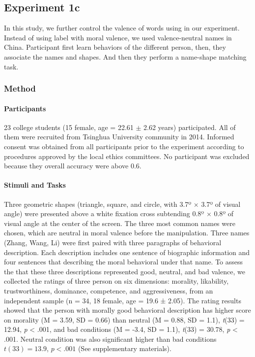 \documentclass[
  english,
  man]{apa6}
\let\oldparagraph\paragraph
\renewcommand{\paragraph}[1]{\oldparagraph{#1}\mbox{}}
\begin{document}
\hypertarget{experiment-1c}{%
\subsection{Experiment 1c}\label{experiment-1c}}

In this study, we further control the valence of words using in our experiment. Instead of using label with moral valence, we used valence-neutral names in China. Participant first learn behaviors of the different person, then, they associate the names and shapes. And then they perform a name-shape matching task.

\hypertarget{method-1}{%
\subsubsection{Method}\label{method-1}}

\hypertarget{participants-2}{%
\paragraph{Participants}\label{participants-2}}

23 college students (15 female, age = 22.61 \(\pm\) 2.62 years) participated. All of them were recruited from Tsinghua University community in 2014. Informed consent was obtained from all participants prior to the experiment according to procedures approved by the local ethics committees. No participant was excluded because they overall accuracy were above 0.6.

\hypertarget{stimuli-and-tasks-2}{%
\paragraph{Stimuli and Tasks}\label{stimuli-and-tasks-2}}

Three geometric shapes (triangle, square, and circle, with 3.7º × 3.7º of visual angle) were presented above a white fixation cross subtending 0.8º × 0.8º of visual angle at the center of the screen. The three most common names were chosen, which are neutral in moral valence before the manipulation.
Three names (Zhang, Wang, Li) were first paired with three paragraphs of behavioral description. Each description includes one sentence of biographic information and four sentences that describing the moral behavioral under that name. To assess the that these three descriptions represented good, neutral, and bad valence, we collected the ratings of three person on six dimensions: morality, likability, trustworthiness, dominance, competence, and aggressiveness, from an independent sample (n = 34, 18 female, age = 19.6 ± 2.05). The rating results showed that the person with morally good behavioral description has higher score on morality (M = 3.59, SD = 0.66) than neutral (M = 0.88, SD = 1.1), \emph{t}(33) = 12.94, \emph{p} \textless{} .001, and bad conditions (M = -3.4, SD = 1.1), \emph{t}(33) = 30.78, \emph{p} \textless{} .001. Neutral condition was also significant higher than bad conditions \(t(33) = 13.9\), \(p < .001\) (See supplementary materials).
\end{document}
